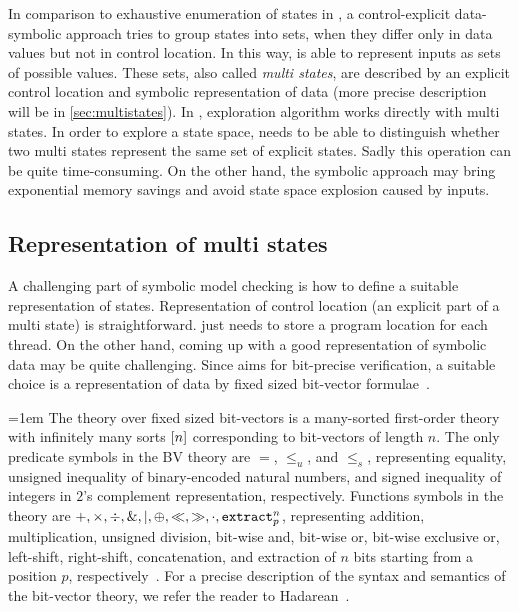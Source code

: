 In comparison to exhaustive enumeration of states in \DIVINE, a control-explicit
data-symbolic approach tries to group states into sets, when they differ only in
data values but not in control location. In this way, \SymDIVINE is able to
represent inputs as sets of possible values. These sets, also called \emph{multi
states}, are described by an explicit control location and symbolic
representation of data (more precise description will be in
\autoref{sec:multistates}). In \SymDIVINE, exploration algorithm works directly
with multi states. In order to explore a state space, \SymDIVINE needs to be
able to distinguish whether two multi states represent the same set of explicit
states. Sadly this operation can be quite time-consuming. On the other hand, the symbolic approach may bring exponential memory savings and avoid state space
explosion caused by inputs.

\subsection{Representation of multi states} \label{sec:multistates}

A challenging part of symbolic model checking is how to define a suitable
representation of states. Representation of control location (an explicit part of a multi state) is straightforward. \SymDIVINE just needs to store
a program location for each thread. On the other hand, coming up with a good
representation of symbolic data may be quite challenging. Since \SymDIVINE aims
for bit-precise verification, a suitable choice is a representation of data
by fixed sized bit-vector formulae~\cite{Bauch14}.

\emergencystretch=1em
The theory over fixed sized bit-vectors is a many-sorted first-order theory with
infinitely many sorts $[n]$ corresponding to bit-vectors of length $n$. The
only predicate symbols in the BV theory are $=$, $\leq_u$, and $\leq_s$,
representing equality, unsigned inequality of binary-encoded natural numbers,
and signed inequality of integers in $2$'s complement representation,
respectively. Functions symbols in the theory are $+, \times, \div, \&, \mid,
\oplus, \ll, \gg, \cdot, \texttt{extract}^{n}_{p}$, representing addition, multiplication,
unsigned division, bit-wise and, bit-wise or, bit-wise exclusive or, left-shift,
right-shift, concatenation, and extraction of $n$ bits starting from a position
$p$, respectively~\cite{Jonas17}. For a precise description of the syntax and
semantics of the bit-vector theory, we refer the reader to
Hadarean~\cite{Hadarean14}.

